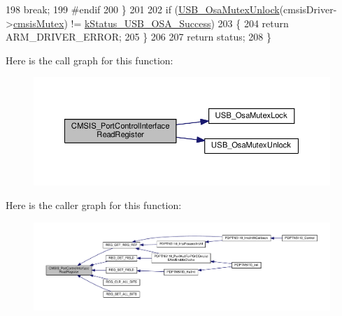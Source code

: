 \begin{DoxyCode}
198             \textcolor{keywordflow}{break};
199 \textcolor{preprocessor}{#endif
}
200 \textcolor{preprocessor}{}    \}
201 
202     \textcolor{keywordflow}{if} (\hyperlink{group__usb__os__abstraction_gaad3249273d566eae00e2cea81192315a}{USB\_OsaMutexUnlock}(cmsisDriver->\hyperlink{struct__cmsis__drier__adapter_a952d05d8262ef9aebfa6ca9c4d62fe46}{cmsisMutex}) != 
      \hyperlink{group__usb__os__abstraction_gga453ebd2f93aafb8c938c3a23c815f9bdab90805fb75297fda1ca60dbb2283f933}{kStatus\_USB\_OSA\_Success})
203     \{
204         \textcolor{keywordflow}{return} ARM\_DRIVER\_ERROR;
205     \}
206 
207     \textcolor{keywordflow}{return} status;
208 \}
\end{DoxyCode}


Here is the call graph for this function\-:
\nopagebreak
\begin{figure}[H]
\begin{center}
\leavevmode
\includegraphics[width=350pt]{group__usb__pd__cmsis__wrapper_ga190a521ef01279662f71d4e33e51aa4c_cgraph}
\end{center}
\end{figure}




Here is the caller graph for this function\-:
\nopagebreak
\begin{figure}[H]
\begin{center}
\leavevmode
\includegraphics[width=350pt]{group__usb__pd__cmsis__wrapper_ga190a521ef01279662f71d4e33e51aa4c_icgraph}
\end{center}
\end{figure}


